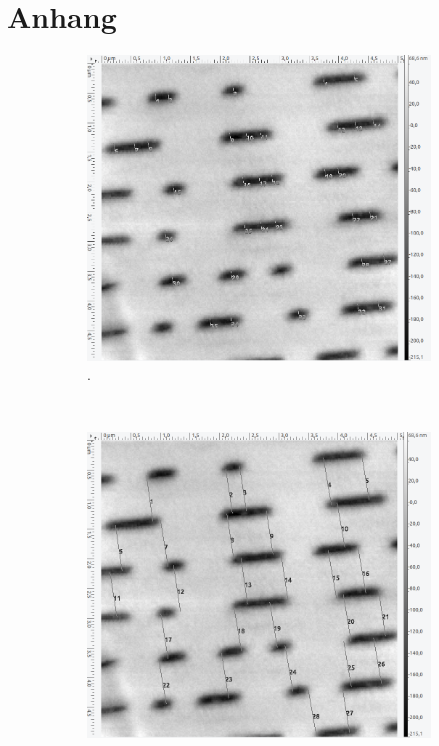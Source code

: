 \section{Anhang}
\label{sec:anhang}

\begin{figure}[H]
\centering
	\begin{subfigure}[t]{0.4\textwidth}
	\includegraphics[width=\textwidth]{AFM_auswertung/dvd_breite.png}
	\caption{.}
	\end{subfigure}
	~
	\begin{subfigure}[t]{0.4\textwidth}
	\includegraphics[width=\textwidth]{AFM_auswertung/dvd_abstand.png}

\end{subfigure}
\end{figure}
